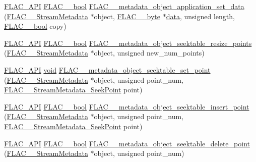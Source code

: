 \begin{DoxyCompactItemize}
\item 
\hyperlink{group__flac__export_ga56ca07df8a23310707732b1c0007d6f5}{F\+L\+A\+C\+\_\+\+A\+PI} \hyperlink{ordinals_8h_a95103469f1cbd78b8cf250194985b34e}{F\+L\+A\+C\+\_\+\+\_\+bool} \hyperlink{group__flac__metadata__object_ga8f7fbaa68d5637e2409a053ec2ff744d}{F\+L\+A\+C\+\_\+\+\_\+metadata\+\_\+object\+\_\+application\+\_\+set\+\_\+data} (\hyperlink{struct_f_l_a_c_____stream_metadata}{F\+L\+A\+C\+\_\+\+\_\+\+Stream\+Metadata} $\ast$object, \hyperlink{ordinals_8h_a5eb569b12d5b047cdacada4d57924ee3}{F\+L\+A\+C\+\_\+\+\_\+byte} $\ast$\hyperlink{jpeglib_8h_aa379dc8ae39e55ae0c431a61a7d2f2bc}{data}, unsigned length, \hyperlink{ordinals_8h_a95103469f1cbd78b8cf250194985b34e}{F\+L\+A\+C\+\_\+\+\_\+bool} copy)
\item 
\hyperlink{group__flac__export_ga56ca07df8a23310707732b1c0007d6f5}{F\+L\+A\+C\+\_\+\+A\+PI} \hyperlink{ordinals_8h_a95103469f1cbd78b8cf250194985b34e}{F\+L\+A\+C\+\_\+\+\_\+bool} \hyperlink{group__flac__metadata__object_ga836f94fa622ece4f50dadf27c7ec107a}{F\+L\+A\+C\+\_\+\+\_\+metadata\+\_\+object\+\_\+seektable\+\_\+resize\+\_\+points} (\hyperlink{struct_f_l_a_c_____stream_metadata}{F\+L\+A\+C\+\_\+\+\_\+\+Stream\+Metadata} $\ast$object, unsigned new\+\_\+num\+\_\+points)
\item 
\hyperlink{group__flac__export_ga56ca07df8a23310707732b1c0007d6f5}{F\+L\+A\+C\+\_\+\+A\+PI} \hyperlink{png_8h_ac9c84fa68bbad002983e35ce3663c686}{void} \hyperlink{group__flac__metadata__object_gae2c58ebdfb9f2b238d45971b14600944}{F\+L\+A\+C\+\_\+\+\_\+metadata\+\_\+object\+\_\+seektable\+\_\+set\+\_\+point} (\hyperlink{struct_f_l_a_c_____stream_metadata}{F\+L\+A\+C\+\_\+\+\_\+\+Stream\+Metadata} $\ast$object, unsigned point\+\_\+num, \hyperlink{struct_f_l_a_c_____stream_metadata___seek_point}{F\+L\+A\+C\+\_\+\+\_\+\+Stream\+Metadata\+\_\+\+Seek\+Point} point)
\item 
\hyperlink{group__flac__export_ga56ca07df8a23310707732b1c0007d6f5}{F\+L\+A\+C\+\_\+\+A\+PI} \hyperlink{ordinals_8h_a95103469f1cbd78b8cf250194985b34e}{F\+L\+A\+C\+\_\+\+\_\+bool} \hyperlink{group__flac__metadata__object_ga0c658260aaffb126486f5d1e211b53e5}{F\+L\+A\+C\+\_\+\+\_\+metadata\+\_\+object\+\_\+seektable\+\_\+insert\+\_\+point} (\hyperlink{struct_f_l_a_c_____stream_metadata}{F\+L\+A\+C\+\_\+\+\_\+\+Stream\+Metadata} $\ast$object, unsigned point\+\_\+num, \hyperlink{struct_f_l_a_c_____stream_metadata___seek_point}{F\+L\+A\+C\+\_\+\+\_\+\+Stream\+Metadata\+\_\+\+Seek\+Point} point)
\item 
\hyperlink{group__flac__export_ga56ca07df8a23310707732b1c0007d6f5}{F\+L\+A\+C\+\_\+\+A\+PI} \hyperlink{ordinals_8h_a95103469f1cbd78b8cf250194985b34e}{F\+L\+A\+C\+\_\+\+\_\+bool} \hyperlink{group__flac__metadata__object_ga5a865f792845cbf22b5935c3d96568d1}{F\+L\+A\+C\+\_\+\+\_\+metadata\+\_\+object\+\_\+seektable\+\_\+delete\+\_\+point} (\hyperlink{struct_f_l_a_c_____stream_metadata}{F\+L\+A\+C\+\_\+\+\_\+\+Stream\+Metadata} $\ast$object, unsigned point\+\_\+num)

\end{DoxyCompactItemize}
